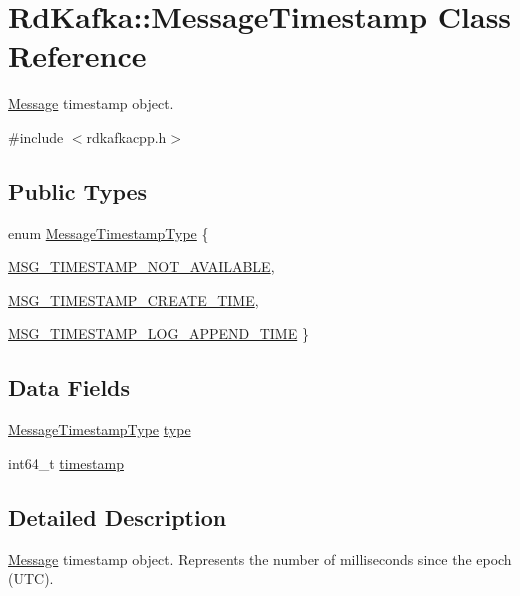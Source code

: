 \hypertarget{classRdKafka_1_1MessageTimestamp}{
\section{RdKafka::MessageTimestamp Class Reference}
\label{classRdKafka_1_1MessageTimestamp}
}


\hyperlink{classRdKafka_1_1Message}{Message} timestamp object.  


{\ttfamily \#include $<$rdkafkacpp.h$>$}\subsection*{Public Types}
\begin{DoxyCompactItemize}
\item 
enum \hyperlink{classRdKafka_1_1MessageTimestamp_a92887c5e7e4e81475fa01c3b88deba6e}{MessageTimestampType} \{ \par
\hyperlink{classRdKafka_1_1MessageTimestamp_a92887c5e7e4e81475fa01c3b88deba6eaf4a555c164095274a0d7834749023a8c}{MSG\_\-TIMESTAMP\_\-NOT\_\-AVAILABLE}, 
\par
\hyperlink{classRdKafka_1_1MessageTimestamp_a92887c5e7e4e81475fa01c3b88deba6ea99a5a5d3ed1a0306739708a223754db8}{MSG\_\-TIMESTAMP\_\-CREATE\_\-TIME}, 
\par
\hyperlink{classRdKafka_1_1MessageTimestamp_a92887c5e7e4e81475fa01c3b88deba6eaa85a7d97576097176459b7351b5f0c28}{MSG\_\-TIMESTAMP\_\-LOG\_\-APPEND\_\-TIME}
 \}
\end{DoxyCompactItemize}
\subsection*{Data Fields}
\begin{DoxyCompactItemize}
\item 
\hyperlink{classRdKafka_1_1MessageTimestamp_a92887c5e7e4e81475fa01c3b88deba6e}{MessageTimestampType} \hyperlink{classRdKafka_1_1MessageTimestamp_aa6efe71306d83563f18d3da2554941fa}{type}
\item 
int64\_\-t \hyperlink{classRdKafka_1_1MessageTimestamp_a5b5b599eeaba1b9cf89d0da436707086}{timestamp}
\end{DoxyCompactItemize}


\subsection{Detailed Description}
\hyperlink{classRdKafka_1_1Message}{Message} timestamp object. Represents the number of milliseconds since the epoch (UTC).

